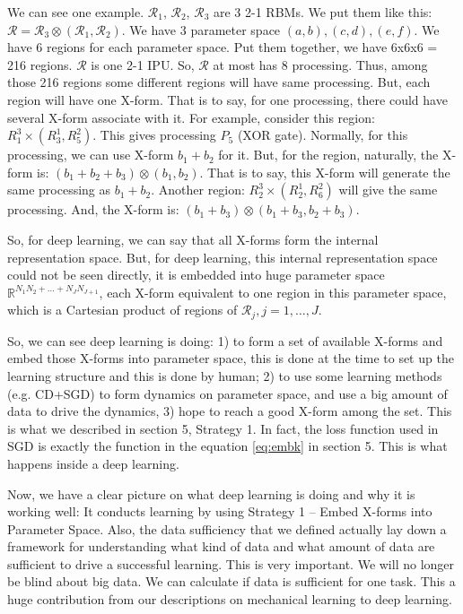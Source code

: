 We can see one example. $\mathcal{R}_1$, $\mathcal{R}_2$, $\mathcal{R}_3$ are 3 2-1 RBMs. We put them like this: $\mathcal{R} = \mathcal{R}_3 \otimes (\mathcal{R}_1, \mathcal{R}_2)$. We have 3 parameter space $(a, b), (c, d), (e, f)$. We have 6 regions for each parameter space. Put them together, we have 6x6x6 = 216 regions. $\mathcal{R}$ is one 2-1 IPU. So, $\mathcal{R}$ at most has 8 processing. Thus, among those 216 regions some different regions will have same processing. But, each region will have one X-form. That is to say, for one processing, there could have several X-form associate with it. For example, consider this region: $R^3_1 \times (R^1_3, R^2_5)$. This gives processing $P_5$ (XOR gate). Normally, for this processing, we can use X-form $b_1 + b_2$ for it. But, for the region, naturally, the X-form is: $(b_1 + b_2 + b_3) \otimes (b_1, b_2)$. That is to say, this X-form will generate the same processing as $b_1 + b_2$. Another region: $R^3_2 \times (R^1_2, R^2_6)$ will give the same processing. And, the X-form is: $(b_1 + b_3) \otimes (b_1+b_3, b_2+b_3)$.    


So, for deep learning, we can say that all X-forms form the internal representation space. But, for deep learning, this internal representation space could not be seen directly, it is embedded into huge parameter space   $\mathbb{R}^{N_1 N_2 + \ldots + N_J N_{J+1}}$, each X-form equivalent to one region in this parameter space, which is a Cartesian product of regions of $\mathcal{R}_j, j=1, \ldots, J$. 

So, we can see deep learning is doing: 1) to form a set of available X-forms and embed those X-forms into parameter space, this is done at the time to set up the learning structure and this is done by human; 2) to use some learning methods (e.g. CD+SGD) to form dynamics on parameter space, and use a big amount of data to drive the dynamics, 3) hope to reach a good X-form among the set. This is what we described in section 5, Strategy 1. In fact, the loss function used in SGD is exactly the function in the equation \eqref{eq:embk} in section 5. This is what happens inside a deep learning. 

Now, we have a clear picture on what deep learning is doing and why it is working well: It conducts learning by using Strategy 1 -- Embed X-forms into Parameter Space. Also, the data sufficiency that we defined actually lay down a framework for understanding what kind of data and what amount of data are sufficient to drive a successful learning. This is very important. We will no longer be blind about big data. We can calculate if data is sufficient for one task. This a huge contribution from our descriptions on mechanical learning to deep learning.
\bigskip


